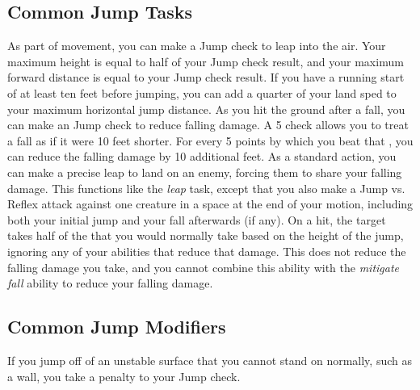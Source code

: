     \subsection{Common Jump Tasks}
         As part of movement, you can make a Jump check to leap into the air.
        Your maximum height is equal to half of your Jump check result, and your maximum forward distance is equal to your Jump check result.
        If you have a running start of at least ten feet before jumping, you can add a quarter of your land sped to your maximum horizontal jump distance.
         As you hit the ground after a fall, you can make an Jump check to reduce falling damage.
        A  5 check allows you to treat a fall as if it were 10 feet shorter.
        For every 5 points by which you beat that , you can reduce the falling damage by 10 additional feet.
         As a standard action, you can make a precise leap to land on an enemy, forcing them to share your falling damage.
        This functions like the \textit{leap} task, except that you also make a Jump vs. Reflex attack against one creature in a space at the end of your motion, including both your initial jump and your fall afterwards (if any).
        On a hit, the target takes half of the  that you would normally take based on the height of the jump, ignoring any of your abilities that reduce that damage.
        This does not reduce the falling damage you take, and you cannot combine this ability with the \textit{mitigate fall} ability to reduce your falling damage.

    \subsection{Common Jump Modifiers}
        If you jump off of an unstable surface that you cannot stand on normally, such as a wall, you take a  penalty to your Jump check.

